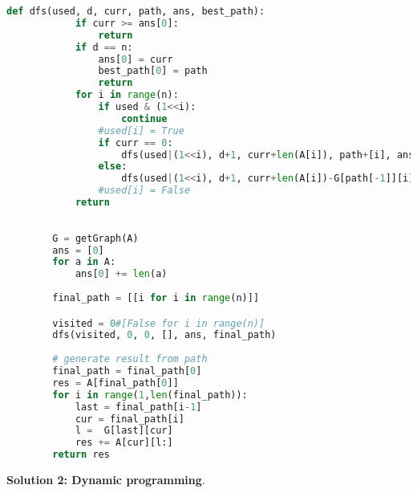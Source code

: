 \documentclass[../main.tex]{subfiles}
\begin{document}
\begin{examples}[resume]
\begin{lstlisting}[language=Python]
        def dfs(used, d, curr, path, ans, best_path):
            if curr >= ans[0]:
                return
            if d == n:
                ans[0] = curr
                best_path[0] = path
                return
            for i in range(n):
                if used & (1<<i):
                    continue
                #used[i] = True
                if curr == 0:
                    dfs(used|(1<<i), d+1, curr+len(A[i]), path+[i], ans, best_path)
                else:
                    dfs(used|(1<<i), d+1, curr+len(A[i])-G[path[-1]][i], path+[i], ans, best_path)
                #used[i] = False
            return
        
        
        G = getGraph(A)
        ans = [0]
        for a in A:
            ans[0] += len(a)
  
        final_path = [[i for i in range(n)]]

        visited = 0#[False for i in range(n)]
        dfs(visited, 0, 0, [], ans, final_path)
        
        # generate result from path
        final_path = final_path[0]
        res = A[final_path[0]]
        for i in range(1,len(final_path)):
            last = final_path[i-1]
            cur = final_path[i]
            l =  G[last][cur]            
            res += A[cur][l:]
        return res
\end{lstlisting}
\textbf{Solution 2: Dynamic programming}. 



\end{examples}
\end{document}
